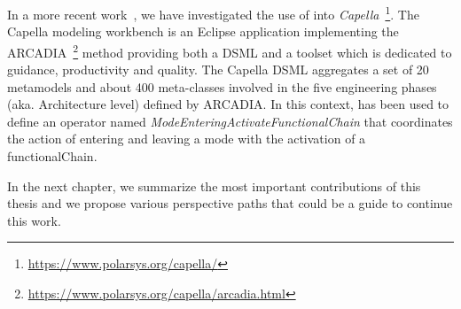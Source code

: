 In a more recent work~\cite{combemaleerts16bib}, we have investigated the use of \bcool into \emph{Capella}~\footnote{\url{https://www.polarsys.org/capella/}}. The Capella modeling workbench is an Eclipse application implementing the ARCADIA~\footnote{\url{https://www.polarsys.org/capella/arcadia.html}} method providing both a DSML and a toolset which is dedicated to guidance, productivity and quality. The Capella DSML aggregates a set of 20 metamodels and about 400 meta-classes involved in the five engineering phases (aka. Architecture level) defined by ARCADIA. In this context, \bcool has been used to define an operator named \emph{ModeEnteringActivateFunctionalChain} that coordinates the action of entering and leaving a mode with the activation of a functionalChain.
	
In the next chapter, we summarize the most important contributions of this thesis and we propose various perspective paths that could be a guide to continue this work. 
	

